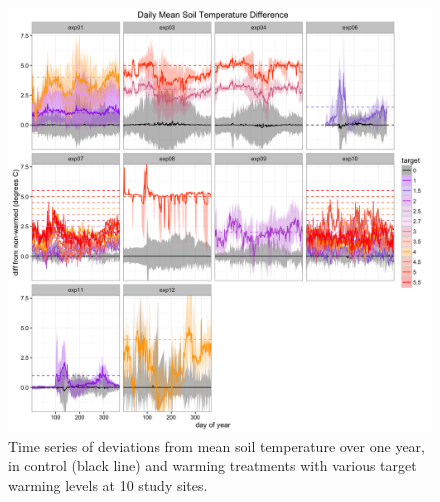 \documentclass{article}
\begin{document}
 \begin{figure}[h]
     \centering
 \includegraphics{../figures/Exploratory_TimeSeries_SoilTemp1Mean_Deviation.png}    
 \caption{Time series of deviations from mean soil temperature over one year, in control (black line) and warming treatments with various target warming levels at 10 study sites.} %
 \end{figure}
\clearpage
\end{document}
